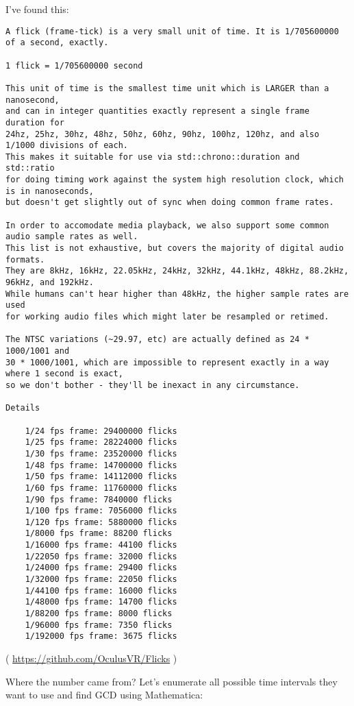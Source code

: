 
I've found this:

\begin{lstlisting}
A flick (frame-tick) is a very small unit of time. It is 1/705600000 of a second, exactly.

1 flick = 1/705600000 second

This unit of time is the smallest time unit which is LARGER than a nanosecond,
and can in integer quantities exactly represent a single frame duration for 
24hz, 25hz, 30hz, 48hz, 50hz, 60hz, 90hz, 100hz, 120hz, and also 1/1000 divisions of each.
This makes it suitable for use via std::chrono::duration and std::ratio 
for doing timing work against the system high resolution clock, which is in nanoseconds,
but doesn't get slightly out of sync when doing common frame rates.

In order to accomodate media playback, we also support some common audio sample rates as well.
This list is not exhaustive, but covers the majority of digital audio formats.
They are 8kHz, 16kHz, 22.05kHz, 24kHz, 32kHz, 44.1kHz, 48kHz, 88.2kHz, 96kHz, and 192kHz. 
While humans can't hear higher than 48kHz, the higher sample rates are used 
for working audio files which might later be resampled or retimed.

The NTSC variations (~29.97, etc) are actually defined as 24 * 1000/1001 and 
30 * 1000/1001, which are impossible to represent exactly in a way where 1 second is exact,
so we don't bother - they'll be inexact in any circumstance.

Details

    1/24 fps frame: 29400000 flicks
    1/25 fps frame: 28224000 flicks
    1/30 fps frame: 23520000 flicks
    1/48 fps frame: 14700000 flicks
    1/50 fps frame: 14112000 flicks
    1/60 fps frame: 11760000 flicks
    1/90 fps frame: 7840000 flicks
    1/100 fps frame: 7056000 flicks
    1/120 fps frame: 5880000 flicks
    1/8000 fps frame: 88200 flicks
    1/16000 fps frame: 44100 flicks
    1/22050 fps frame: 32000 flicks
    1/24000 fps frame: 29400 flicks
    1/32000 fps frame: 22050 flicks
    1/44100 fps frame: 16000 flicks
    1/48000 fps frame: 14700 flicks
    1/88200 fps frame: 8000 flicks
    1/96000 fps frame: 7350 flicks
    1/192000 fps frame: 3675 flicks
\end{lstlisting}

( \url{https://github.com/OculusVR/Flicks} )

Where the number came from?
Let's enumerate all possible time intervals they want to use and find GCD using Mathematica:

